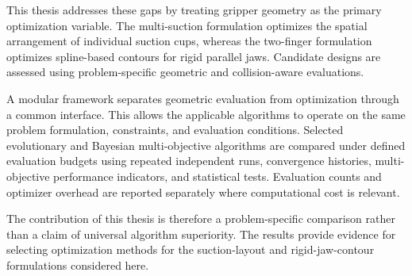 This thesis addresses these gaps by treating gripper geometry as the primary optimization variable. The multi-suction formulation optimizes the
spatial arrangement of individual suction cups, whereas the two-finger formulation optimizes spline-based contours for rigid parallel jaws. Candidate
designs are assessed using problem-specific geometric and collision-aware evaluations.

A modular framework separates geometric evaluation from optimization through a common interface. This allows the applicable algorithms to operate on
the same problem formulation, constraints, and evaluation conditions. Selected evolutionary and Bayesian multi-objective algorithms are compared under
defined evaluation budgets using repeated independent runs, convergence histories, multi-objective performance indicators, and statistical tests.
Evaluation counts and optimizer overhead are reported separately where computational cost is relevant.

The contribution of this thesis is therefore a problem-specific comparison rather than a claim of universal algorithm superiority. The results provide
evidence for selecting optimization methods for the suction-layout and rigid-jaw-contour formulations considered here.
